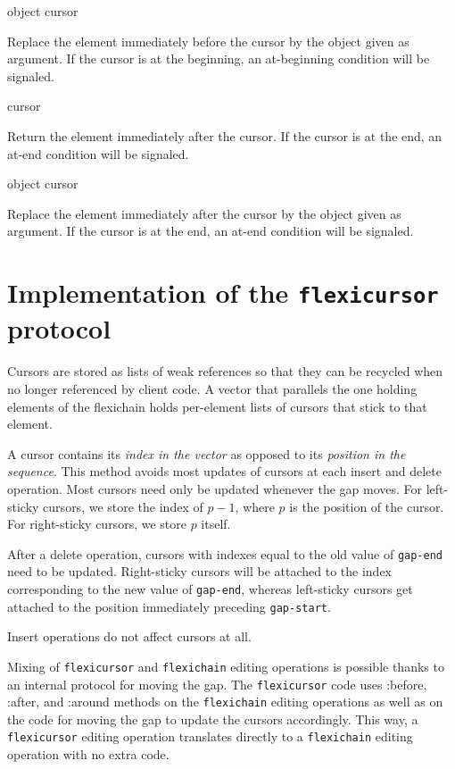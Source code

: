\documentclass[11pt]{article}
\begin{document}
 {object cursor}

Replace the element immediately before the cursor by the object given
as argument.  If the cursor is at the beginning, an at-beginning
condition will be signaled.

 {cursor}

Return the element immediately after the cursor.  If the cursor is
at the end, an at-end condition will be signaled. 

 {object cursor}

Replace the element immediately after the cursor by the object given
as argument.  If the cursor is at the end, an at-end condition will be
signaled.

\section{Implementation of the \texttt{flexicursor} protocol}

Cursors are stored as lists of weak references so that they can be
recycled when no longer referenced by client code.  A vector that
parallels the one holding elements of the flexichain holds per-element
lists of cursors that stick to that element. 

A cursor contains its \textit{index in the vector} as opposed to its
\textit{position in the sequence}.  This method avoids most updates of
cursors at each insert and delete operation.  Most cursors need only
be updated whenever the gap moves.  For left-sticky cursors, we store
the index of $p-1$, where $p$ is the position of the cursor.  For
right-sticky cursors, we store $p$ itself. 

After a delete operation, cursors with indexes equal to the old value
of \texttt{gap-end} need to be updated.  Right-sticky cursors will be
attached to the index corresponding to the new value of
\texttt{gap-end}, whereas left-sticky cursors get attached to the
position immediately preceding \texttt{gap-start}. 

Insert operations do not affect cursors at all. 

Mixing of \texttt{flexicursor} and \texttt{flexichain} editing
operations is possible thanks to an internal protocol for moving the
gap.  The \texttt{flexicursor} code uses :before, :after, and :around
methods on the \texttt{flexichain} editing operations as well as on
the code for moving the gap to update the cursors accordingly.  This
way, a \texttt{flexicursor} editing operation translates directly to a
\texttt{flexichain} editing operation with no extra code.
\end{document}
